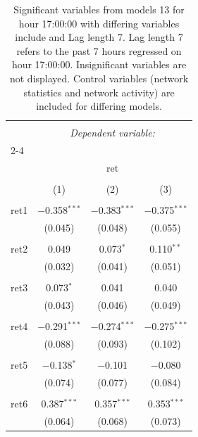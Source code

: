 
\begin{table}[!htbp] \centering 
  \caption{Significant variables from models 13 for hour 17:00:00 with differing variables include 
                               and Lag length 7. Lag length 7 refers to the past 7 hours regressed on hour 17:00:00. 
                               Insignificant variables are not displayed. 
                               Control variables (network statistics and network activity) are 
                               included for differing models.} 
  \label{RVmodels2_t_hourlagged4} 
\scriptsize 
\begin{tabular}{@{\extracolsep{5pt}}lccc} 
\\[-1.8ex]\hline 
\hline \\[-1.8ex] 
 & \multicolumn{3}{c}{\textit{Dependent variable:}} \\ 
\cline{2-4} 
\\[-1.8ex] & \multicolumn{3}{c}{ret} \\ 
\\[-1.8ex] & (1) & (2) & (3)\\ 
\hline \\[-1.8ex] 
 ret1 & $-$0.358$^{***}$ & $-$0.383$^{***}$ & $-$0.375$^{***}$ \\ 
  & (0.045) & (0.048) & (0.055) \\ 
  & & & \\ 
 ret2 & 0.049 & 0.073$^{*}$ & 0.110$^{**}$ \\ 
  & (0.032) & (0.041) & (0.051) \\ 
  & & & \\ 
 ret3 & 0.073$^{*}$ & 0.041 & 0.040 \\ 
  & (0.043) & (0.046) & (0.049) \\ 
  & & & \\ 
 ret4 & $-$0.291$^{***}$ & $-$0.274$^{***}$ & $-$0.275$^{***}$ \\ 
  & (0.088) & (0.093) & (0.102) \\ 
  & & & \\ 
 ret5 & $-$0.138$^{*}$ & $-$0.101 & $-$0.080 \\ 
  & (0.074) & (0.077) & (0.084) \\ 
  & & & \\ 
 ret6 & 0.387$^{***}$ & 0.357$^{***}$ & 0.353$^{***}$ \\ 
  & (0.064) & (0.068) & (0.073) \\ 

\end{tabular}
\end{table}

